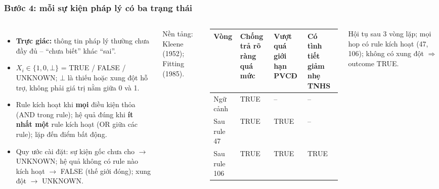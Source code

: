 \begin{frame}
\frametitle{Bước 4: mỗi sự kiện pháp lý có ba trạng thái}
\begin{columns}[T,onlytextwidth]
\footnotesize
\begin{itemize}
  \item \textbf{Trực giác:} thông tin pháp lý thường chưa đầy đủ -- ``chưa biết'' khác ``sai''.
  \item $X_i\in\{1,0,\bot\}$ = TRUE / FALSE / UNKNOWN; $\bot$ là thiếu hoặc xung đột hỗ trợ,
        không phải giá trị nằm giữa 0 và 1.
  \item Rule kích hoạt khi \textbf{mọi} điều kiện thỏa (AND trong rule); hệ quả đúng khi
        \textbf{ít nhất một} rule kích hoạt (OR giữa các rule); lặp đến điểm bất động.
  \item Quy ước cài đặt: sự kiện gốc chưa cho $\rightarrow$ UNKNOWN; hệ quả không có rule nào
        kích hoạt $\rightarrow$ FALSE (thế giới đóng); xung đột $\rightarrow$ UNKNOWN.
\end{itemize}
{\scriptsize\color{schemaGray} Nền tảng: Kleene (1952); Fitting (1985).}


\vspace{0.1cm}
\scriptsize
\setlength{\tabcolsep}{3pt}
\renewcommand{\arraystretch}{1.25}
\newcommand{\tv}{\cellcolor{schemaGreen!22}TRUE}
\newcommand{\un}{\cellcolor{schemaGray!12}--}
\begin{tabular}{@{}>{\raggedright\arraybackslash}p{1.55cm}
                >{\centering\arraybackslash}p{1.45cm}
                >{\centering\arraybackslash}p{1.45cm}
                >{\centering\arraybackslash}p{1.45cm}@{}}
\toprule
\textbf{Vòng} & \textbf{Chống trả rõ ràng quá mức} & \textbf{Vượt quá giới hạn PVCĐ} & \textbf{Có tình tiết giảm nhẹ TNHS}\\
\midrule
Ngữ cảnh & \tv & \un & \un\\
Sau rule 47 & \tv & \tv & \un\\
Sau rule 106 & \tv & \tv & \tv\\
\bottomrule
\end{tabular}

\vspace{0.08cm}
Hội tụ sau 3 vòng lặp; mọi hop có rule kích hoạt (47, 106); không có xung đột
$\Rightarrow$ outcome TRUE.
\end{columns}

\vspace{0.05cm}
\end{frame}

